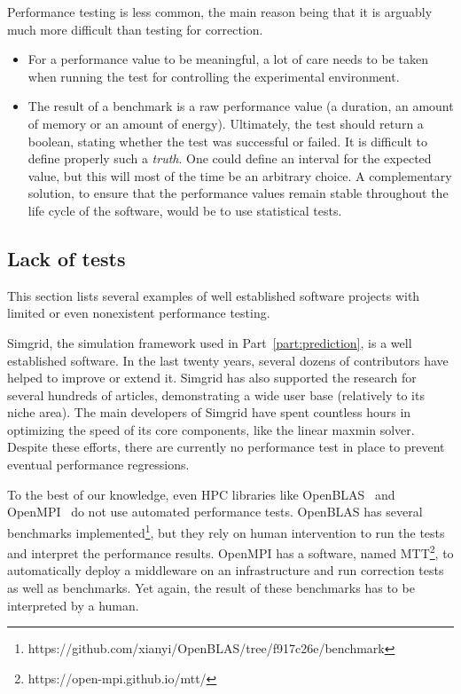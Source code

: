         Performance testing is less common, the main reason being that it is arguably much more difficult than testing
        for correction.
        \begin{itemize}
            \item For a performance value to be meaningful, a lot of care needs to be taken when running the test for
                controlling the experimental environment.
            \item The result of a benchmark is a raw performance value (\eg a duration, an amount of memory or an amount
                of energy). Ultimately, the test should return a boolean, stating whether the test was successful or
                failed. It is difficult to define properly such a \emph{truth}. One could define an interval for the
                expected value, but this will most of the time be an arbitrary choice. A complementary solution, to
                ensure that the performance values remain stable throughout the life cycle of the software, would be to
                use statistical tests.
        \end{itemize}

        \subsection{Lack of tests}%
        \label{sub:lack_of_tests}

            This section lists several examples of well established software projects with limited or even nonexistent
            performance testing.

            Simgrid\cite{simgrid}, the simulation framework used in Part~\ref{part:prediction}, is a well established
            software. In the last twenty years, several dozens of contributors have helped to improve or extend it.
            Simgrid has also supported the research for several hundreds of articles, demonstrating a wide user base
            (relatively to its niche area). The main developers of Simgrid have spent countless hours in optimizing the
            speed of its core components, like the linear maxmin solver. Despite these efforts, there are currently no
            performance test in place to prevent eventual performance regressions.

            To the best of our knowledge, even HPC libraries like OpenBLAS~\cite{openblas} and OpenMPI~\cite{openmpi} do
            not use automated performance tests. OpenBLAS has several benchmarks
            implemented\footnote{https://github.com/xianyi/OpenBLAS/tree/f917c26e/benchmark}, but they rely on human
            intervention to run the tests and interpret the performance results. OpenMPI has a software, named
            MTT\footnote{https://open-mpi.github.io/mtt/}, to automatically deploy a middleware on an infrastructure and
            run correction tests as well as benchmarks. Yet again, the result of these benchmarks has to be interpreted
            by a human.

